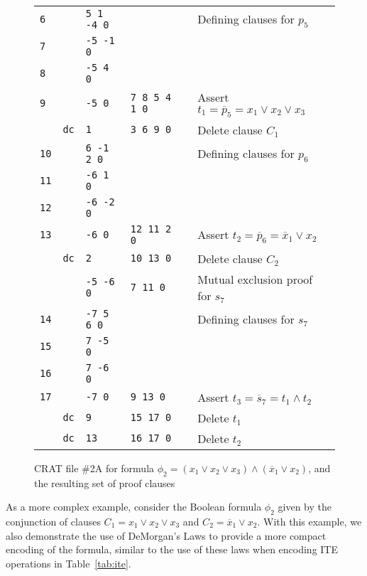 \documentclass{llncs}
\newcommand{\obar}[1]{\overline{#1}}
\begin{document}
\begin{figure}
\begin{center}
\begin{tabular}{lcllll}
    {\tt 6} &   & {\tt 5 1 -4 0} &    & & Defining clauses for $p_5$ \\
    {\tt 7} &   & {\tt -5 -1 0} &     & & \\
    {\tt 8} &   & {\tt -5 4 0} &      & & \\

    {\tt 9} &   & {\tt -5 0} & {\tt 7 8 5 4 1 0} & & Assert $t_1 = \obar{p}_5 = x_1 \lor x_2 \lor x_3$ \\
            & {\tt dc}  & {\tt 1 } & {\tt 3 6 9 0} & & Delete clause $C_1$\\

    {\tt 10} &   & {\tt 6 -1 2 0}  &    & & Defining clauses for $p_6$ \\ 
    {\tt 11} &   & {\tt -6 1 0}    &  & & \\
    {\tt 12} &   & {\tt -6 -2 0}    &  & & \\ 
    {\tt 13} &  & {\tt -6 0} & {\tt 12 11 2 0}  & & Assert $t_2 = \obar{p}_6 = \obar{x}_1 \lor x_2$ \\
            & {\tt dc}  & {\tt 2 } & {\tt 10 13 0} & & Delete clause $C_2$\\
             &          & {\tt -5 -6 0} & {\tt 7 11 0}  & & Mutual exclusion proof for $s_7$ \\
    {\tt 14} &   & {\tt -7 5 6 0}  &     & & Defining clauses for $s_7$ \\ 
    {\tt 15} &   & {\tt  7 -5 0}    &  &  \\  
    {\tt 16} &   & {\tt  7 -6 0}    &  & &  \\
    {\tt 17} &   & {\tt -7 0}       & {\tt 9 13 0} & & Assert $t_3 = \obar{s}_7 = t_1 \land t_2$ \\
             & {\tt dc}  & {\tt 9}          & {\tt 15 17 0} & & Delete $t_1$\\
             & {\tt dc}  & {\tt 13}         & {\tt 16 17 0} & & Delete $t_2$\\
  \end{tabular}
  \end{center}  
  \caption{CRAT file \#2A for formula $\phi_2 = (x_1 \lor x_2 \lor x_3) \land (\obar{x}_1 \lor x_2)$, and the resulting set of proof clauses}
  \label{fig:p2-bdd:crat}
\end{figure}

As a more complex example, consider the Boolean formula $\phi_2$ given
by the conjunction of clauses $C_1 = x_1 \lor x_2 \lor x_3$ and $C_2 =
\obar{x}_1 \lor x_2$.  With this example, we also demonstrate the use
of DeMorgan's Laws to provide a more compact encoding of the formula,
similar to the use of these laws when encoding ITE operations in
Table~\ref{tab:ite}.
\end{document}
